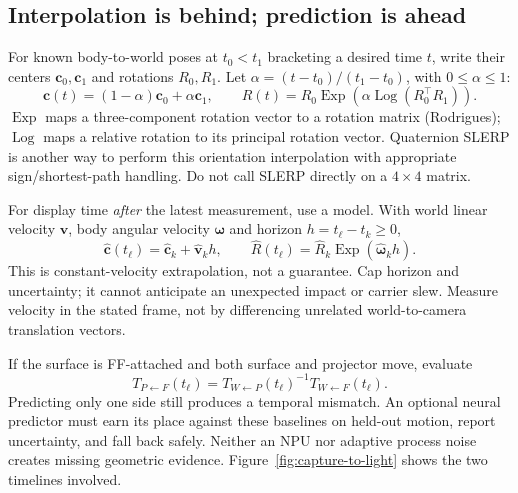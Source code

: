 \documentclass[11pt,a4paper]{article}
\newcommand{\T}[2]{T_{#1\leftarrow #2}}
\DeclareMathOperator{\Exp}{Exp}
\DeclareMathOperator{\Log}{Log}
\begin{document}
\subsection{Interpolation is behind; prediction is ahead}
For known body-to-world poses at $t_0<t_1$ bracketing a desired time $t$,
write their centers $\bm{c}_0,\bm{c}_1$ and rotations $R_0,R_1$.
Let $\alpha=(t-t_0)/(t_1-t_0)$, with $0\leq\alpha\leq1$:
\begin{equation}
\bm{c}(t)=(1-\alpha)\bm{c}_0+\alpha\bm{c}_1,\qquad
R(t)=R_0\Exp\!\left(\alpha\Log(R_0^\top R_1)\right).
\label{eq:interp}
\end{equation}
$\Exp$ maps a three-component rotation vector to a rotation matrix
(Rodrigues); $\Log$ maps a relative rotation to its principal rotation
vector. Quaternion SLERP is another way to perform this orientation
interpolation with appropriate sign/shortest-path handling.
Do not call SLERP directly on a $4\times4$ matrix.

For display time \emph{after} the latest measurement, use a model.
With world linear velocity $\bm{v}$, body angular velocity $\bm{\omega}$
and horizon $h=t_\ell-t_k\geq0$,
\begin{equation}
\hat{\bm{c}}(t_\ell)=\hat{\bm{c}}_k+\hat{\bm{v}}_kh,\qquad
\hat R(t_\ell)=\hat R_k\Exp(\hat{\bm{\omega}}_kh).
\label{eq:predict}
\end{equation}
This is constant-velocity extrapolation, not a guarantee. Cap horizon and
uncertainty; it cannot anticipate an unexpected impact or carrier slew.
Measure velocity in the stated frame, not by differencing unrelated
world-to-camera translation vectors.

If the surface is FF-attached and both surface and projector move, evaluate
\begin{equation}
\T{P}{F}(t_\ell)=
\T{W}{P}(t_\ell)^{-1}\T{W}{F}(t_\ell).
\end{equation}
Predicting only one side still produces a temporal mismatch.
An optional neural predictor must earn its place against these baselines
on held-out motion, report uncertainty, and fall back safely.
Neither an NPU nor adaptive process noise creates missing geometric evidence.
Figure~\ref{fig:capture-to-light} shows the two timelines involved.
\end{document}

